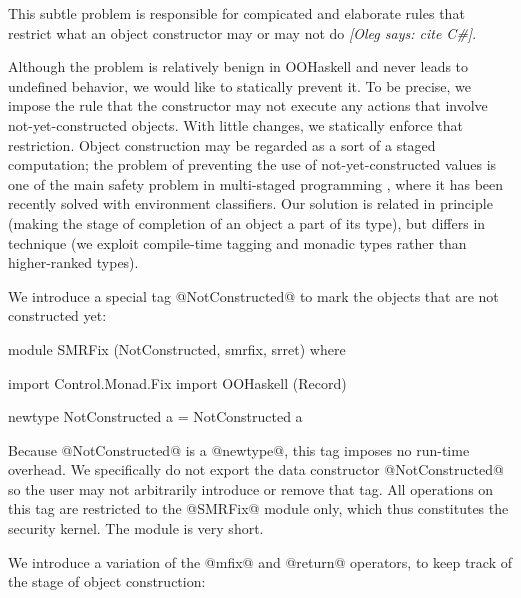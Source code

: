 \documentclass{jfp}
\newcommand{\oleg}[1]{{\it [Oleg says: #1]}}
\begin{document}

This subtle problem is responsible for compicated and elaborate rules
that restrict what an object constructor may or may not do \oleg{cite C\#}.


Although the problem is relatively benign in OOHaskell and never leads
to undefined behavior, we would like to statically prevent it. To be
precise, we impose the rule that the constructor may not execute any
actions that involve not-yet-constructed objects. With little changes,
we statically enforce that restriction. Object construction may be
regarded as a sort of a staged computation; the problem of preventing
the use of not-yet-constructed values is one of the main safety
problem in multi-staged programming \cite{env-classifiers}, where it
has been recently solved with environment classifiers. Our solution is
related in principle (making the stage of completion of an object a
part of its type), but differs in technique (we exploit compile-time
tagging and monadic types rather than higher-ranked types).

We introduce a special tag @NotConstructed@ to mark the objects that
are not constructed yet:

\begin{code}
module SMRFix (NotConstructed, smrfix, srret) where

import Control.Monad.Fix
import OOHaskell (Record)

newtype NotConstructed a = NotConstructed a
\end{code}

Because @NotConstructed@ is a @newtype@, this tag imposes no run-time
overhead. We specifically do not export the data constructor
@NotConstructed@ so the user may not arbitrarily introduce or remove
that tag. All operations on this tag are restricted to the @SMRFix@
module only, which thus constitutes the security kernel. The module is
very short.

We introduce a variation of the @mfix@ and @return@ operators, to
keep track of the stage of object construction:

\end{document}
